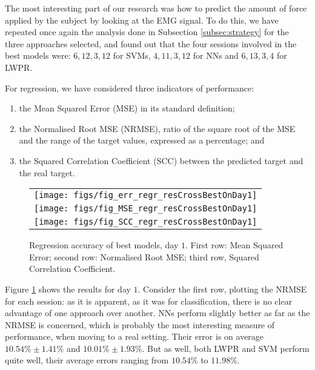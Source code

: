 The most interesting part of our research was how to predict the
amount of force applied by the subject by looking at the EMG
signal. To do this, we have repeated once again the analysis done in
Subsection \ref{subsec:strategy} for the three approaches selected,
and found out that the four sessions involved in the best models were:
$6,12,3,12$ for SVMs, $4,11,3,12$ for NNs and $6,13,3,4$ for LWPR.

For regression, we have considered three indicators of performance:

\begin{enumerate}

  \item the Mean Squared Error (MSE) in its standard definition;

  \item the Normalised Root MSE (NRMSE), ratio of the square root of
    the MSE and the range of the target values, expressed as a
    percentage; and

  \item the Squared Correlation Coefficient (SCC) between the
    predicted target and the real target.

\end{enumerate}

\begin{figure}\centering
  \begin{tabular}{c}
    \texttt{[image: figs/fig\_err\_regr\_resCrossBestOnDay1]}\\
    \texttt{[image: figs/fig\_MSE\_regr\_resCrossBestOnDay1]} \\
    \texttt{[image: figs/fig\_SCC\_regr\_resCrossBestOnDay1]} \\
  \end{tabular}
  \caption{Regression accuracy of best models, day $1$. First row: Mean Squared Error; second
    row: Normalised Root MSE; third row, Squared Correlation Coefficient.}
  \label{fig:best_regr}
\end{figure}

Figure \ref{fig:best_regr} shows the results for day $1$. Consider
the first row, plotting the NRMSE for each session: as it is
apparent, as it was for classification, there is no clear
advantage of one approach over another. NNs perform slightly
better as far as the NRMSE is concerned, which is probably the
most interesting measure of performance, when moving to a real
setting. Their error is on average $10.54\% \pm 1.41\%$ and
$10.01\% \pm 1.93\%$. But as well, both LWPR and SVM perform quite
well, their average errors ranging from $10.54\%$ to $11.98\%$.

